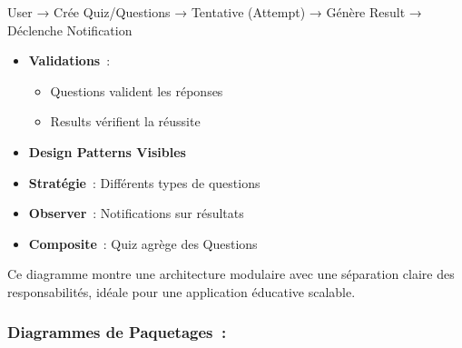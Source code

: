 \documentclass[12pt,a4paper,twoside]{report}
\begin{document}
User → Crée Quiz/Questions → Tentative (Attempt) → Génère Result →
Déclenche Notification

\begin{itemize}
\item
  \textbf{Validations}~:

  \begin{itemize}
  \item
    Questions valident les réponses
  \item
    Results vérifient la réussite
  \end{itemize}
\end{itemize}

\begin{itemize}
\item
  \textbf{Design Patterns Visibles}
\end{itemize}

\begin{itemize}
\item
  \textbf{Stratégie}~: Différents types de questions
\item
  \textbf{Observer}~: Notifications sur résultats
\item
  \textbf{Composite}~: Quiz agrège des Questions
\end{itemize}

Ce diagramme montre une architecture modulaire avec une séparation
claire des responsabilités, idéale pour une application éducative
scalable.

\hypertarget{diagrammes-de-paquetages}{%
\subsubsection{Diagrammes de
Paquetages~:}\label{diagrammes-de-paquetages}}
\end{document}
